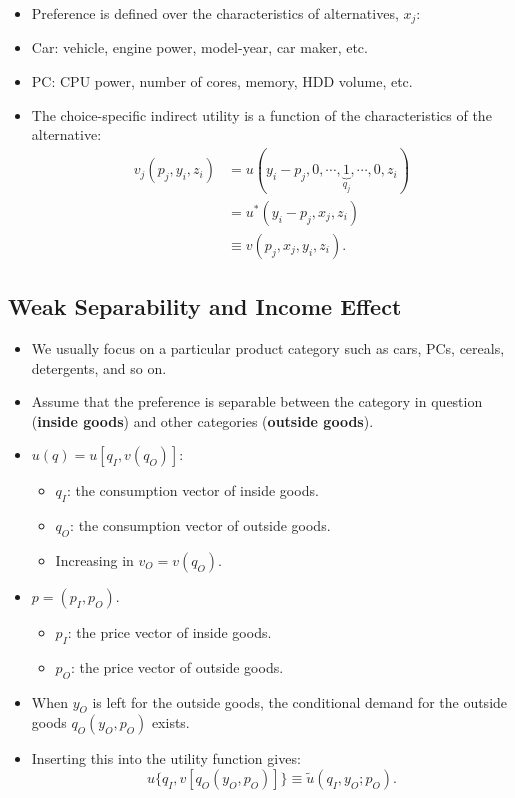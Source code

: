 \documentclass[
]{book}
\providecommand{\tightlist}{%
  \setlength{\itemsep}{0pt}\setlength{\parskip}{0pt}}
\begin{document}
\begin{itemize}
\item
  Preference is defined over the characteristics of alternatives, \(x_j\):
\item
  Car: vehicle, engine power, model-year, car maker, etc.
\item
  PC: CPU power, number of cores, memory, HDD volume, etc.
\item
  The choice-specific indirect utility is a function of the characteristics of the alternative:
  \begin{equation}
  \begin{split}
  v_j(p_j, y_i, z_i) &=u(y_i - p_j, 0, \cdots, \underbrace{1}_{q_j}, \cdots, 0, z_i)\\
  &= u^*(y_i - p_j, x_j, z_i)\\
  &\equiv v(p_j, x_j, y_i, z_i).
  \end{split}
  \end{equation}
\end{itemize}

\hypertarget{weak-separability-and-income-effect}{%
\subsection{Weak Separability and Income Effect}\label{weak-separability-and-income-effect}}

\begin{itemize}
\tightlist
\item
  We usually focus on a particular product category such as cars, PCs, cereals, detergents, and so on.
\item
  Assume that the preference is separable between the category in question (\textbf{inside goods}) and other categories (\textbf{outside goods}).
\item
  \(u(q) = u[q_I, v(q_O)]\):

  \begin{itemize}
  \tightlist
  \item
    \(q_I\): the consumption vector of inside goods.
  \item
    \(q_O\): the consumption vector of outside goods.
  \item
    Increasing in \(v_O = v(q_O)\).
  \end{itemize}
\item
  \(p = (p_I, p_O)\).

  \begin{itemize}
  \tightlist
  \item
    \(p_I\): the price vector of inside goods.
  \item
    \(p_O\): the price vector of outside goods.
  \end{itemize}
\item
  When \(y_O\) is left for the outside goods, the conditional demand for the outside goods \(q_O(y_O, p_O)\) exists.
\item
  Inserting this into the utility function gives:
  \begin{equation}
  u\{q_I, v[q_O(y_O, p_O)]\} \equiv \tilde{u}(q_I, y_O; p_O).
  \end{equation}
\end{itemize}
\end{document}
